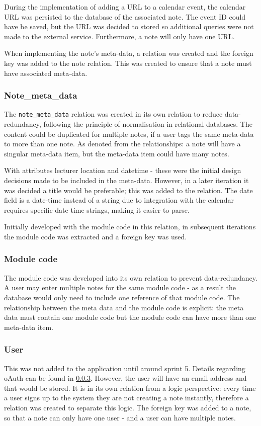 During the implementation of adding a URL to a calendar event, the calendar URL was persisted to the database of the associated note. The event ID could have be saved, but the URL was decided to stored so additional queries were not made to the external service. Furthermore, a note will only have one URL.

When implementing the note's meta-data, a relation was created and the foreign key was added to the note relation. This was created to ensure that a note must have associated meta-data.

\subsubsection{Note\_meta\_data}
The \texttt{note\_meta\_data} relation was created in its own relation to reduce data-redundancy, following the principle of normalisation in relational databases. The content could be duplicated for multiple notes, if a user tags the same meta-data to more than one note. As denoted from the relationships: a note will have a singular meta-data item, but the meta-data item could have many notes.

With attributes lecturer location and datetime - these were the initial design decisions made to be included in the meta-data. However, in a later iteration it was decided a title would be preferable; this was added to the relation. The date field is a date-time instead of a string due to integration with the calendar requires specific date-time strings, making it easier to parse.

Initially developed with the module code in this relation, in subsequent iterations the module code was extracted and a foreign key was used.

\subsubsection{Module code}
The module code was developed into its own relation to prevent data-redundancy. A user may enter multiple notes for the same module code - as a result the database would only need to include one reference of that module code. The relationship between the meta data and the module code is explicit: the meta data must contain one module code but the module code can have more than one meta-data item.

\subsubsection{User}
This was not added to the application until around sprint 5. Details regarding oAuth can be found in \ref{}. However, the user will have an email address and that would be stored. It is in its own relation from a logic perspective: every time a user signs up to the system they are not creating a note instantly, therefore a relation was created to separate this logic. The foreign key was added to a note, so that a note can only have one user - and a user can have multiple notes.


